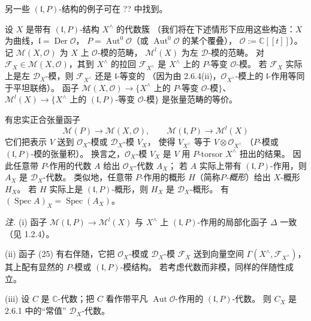 另一些 $(\mathfrak{l},P)$-结构的例子可在 ?? 中找到。

 设 $X$ 是带有 $(\mathfrak{l},P)$-结构 $X^{\wedge}$ 的代数簇
（我们将在下述情形下应用这些构造：$X$ 为曲线，$\mathfrak{l}=\operatorname{Der}\mathcal{O}$，
$P=\operatorname{Aut}^0\mathcal{O}$（或 $\operatorname{Aut}^0\mathcal{O}$ 的某个覆叠），
$\mathcal{O}:=\mathbb{C}[[t]]$）。
记 $\mathcal{M}(X,\mathcal{O})$ 为 $X$ 上 $\mathcal{O}$-模的范畴，
$\mathcal{M}^l(X)$ 为左 $\mathcal{D}$-模的范畴。
对 $\mathcal{F}_X\in\mathcal{M}(X,\mathcal{O})$，其到 $X^{\wedge}$ 的拉回
$\mathcal{F}_{X^{\wedge}}$ 是 $X^{\wedge}$ 上的 $P$-等变 $\mathcal{O}$-模。
若 $\mathcal{F}_X$ 实际上是左 $\mathcal{D}_X$-模，则 $\mathcal{F}_{X^{\wedge}}$ 还是 $\mathfrak{l}$-等变的
（因为由 2.6.4(ii)，$\mathcal{O}_{X^{\wedge}}$-模上的 $\mathfrak{l}$-作用等同于平坦联络）。
函子
$\mathcal{M}(X,\mathcal{O})\to\{X^{\wedge}\text{ 上的 }P\text{-等变 }\mathcal{O}\text{-模}\}$、
$\mathcal{M}^l(X)\to\{X^{\wedge}\text{ 上的 }(\mathfrak{l},P)\text{-等变 }\mathcal{O}\text{-模}\}$
是张量范畴的等价。

有忠实正合张量函子
\begin{equation}\tag{25}
\mathcal{M}(P)\longrightarrow\mathcal{M}(X,\mathcal{O}),\qquad
\mathcal{M}(\mathfrak{l},P)\longrightarrow\mathcal{M}^l(X)
\end{equation}
它们把表示 $V$ 送到 $\mathcal{O}_X$-模或 $\mathcal{D}_X$-模 $V_X$，
使得 $V_{X^{\wedge}}$ 等于 $V\otimes\mathcal{O}_{X^{\wedge}}$
（$P$-模或 $(\mathfrak{l},P)$-模的张量积）。
换言之，$\mathcal{O}_X$-模 $V_X$ 是 $V$ 用 $P$-torsor $X^{\wedge}$ 扭出的结果。
因此任意带 $P$-作用的代数 $A$ 给出 $\mathcal{O}_X$-代数 $A_X$；
若 $A$ 实际上带有 $(\mathfrak{l},P)$-作用，则 $A_X$ 是 $\mathcal{D}_X$-代数。
类似地，任意带 $P$-作用的概形 $H$（简称\emph{$P$-概形}）给出 $X$-概形 $H_X$。
若 $H$ 实际上是 $(\mathfrak{l},P)$-概形，则 $H_X$ 是 $\mathcal{D}_X$-概形。
有 $(\operatorname{Spec} A)_X=\operatorname{Spec}(A_X)$。

\emph{注.} (i) 函子 $\mathcal{M}(\mathfrak{l},P)\longrightarrow\mathcal{M}^l(X)$
与 $X^{\wedge}$ 上 $(\mathfrak{l},P)$-作用的局部化函子 $\Delta$ 一致（见 1.2.4）。

(ii) 函子 (25) 有右伴随，它把 $\mathcal{O}_X$-模或 $\mathcal{D}_X$-模 $\mathcal{F}_X$ 送到向量空间
$\Gamma(X^{\wedge},\mathcal{F}_{X^{\wedge}})$，其上配有显然的 $P$-模或 $(\mathfrak{l},P)$-模结构。
若考虑代数而非模，同样的伴随性成立。

(iii) 设 $C$ 是 $\mathbb{C}$-代数；把 $C$ 看作带平凡 $\operatorname{Aut}\mathcal{O}$-作用的 $(\mathfrak{l},P)$-代数。
则 $C_X$ 是 2.6.1 中的“常值” $\mathcal{D}_X$-代数。

